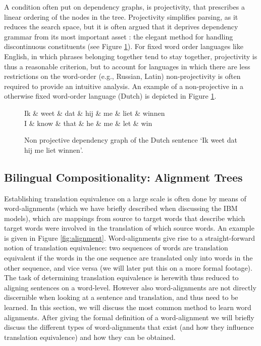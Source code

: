 \documentclass{report}
\theoremstyle{break}
\begin{document}
A condition often put on dependency graphs, is projectivity, that prescribes a linear ordering of the nodes in the tree. Projectivity simplifies parsing, as it reduces the search space, but it is often argued that it deprives dependency grammar from its most important asset \citep{covington1990dependency,debusmann2000introduction}: the elegant method for handling discontinuous constituents (see Figure \ref{fig:npdeptree}). For fixed word order languages like English, in which phrases belonging together tend to stay together, projectivity is thus a reasonable criterion, but to account for languages in which there are less restrictions on the word-order (e.g., Russian, Latin) non-projectivity is often required to provide an intuitive analysis. An example of a non-projective in a otherwise fixed word-order language (Dutch) is depicted in Figure \ref{fig:npdeptree}.

\begin{figure}[!ht]
\centering
\begin{dependency}[theme=simple]%
\begin{deptext}[column sep=.5cm, row sep=.1ex]
Ik \& weet \& dat \& hij \& me \& liet \& winnen\\
\tiny{I} \& \tiny{know} \& \tiny{that} \& \tiny{he} \& \tiny{me} \& \tiny{let} \& \tiny{win}\\
\end{deptext}
\end{dependency}
\caption{Non projective dependency graph of the Dutch sentence `Ik weet dat hij me liet winnen'.}\label{fig:npdeptree}
\end{figure}

\subsection{Bilingual Compositionality: Alignment Trees}

Establishing translation equivalence on a large scale is often done by means of word-alignments (which we have briefly described when discussing the IBM models), which are mappings from source to target words that describe which target words were involved in the translation of which source words. An example is given in Figure \ref{fig:alignment}. Word-alignments give rise to a straight-forward notion of translation equivalence: two sequences of words are translation equivalent if the words in the one sequence are translated only into words in the other sequence, and vice versa (we will later put this on a more formal footage). The task of determining translation equivalence is herewith thus reduced to aligning sentences on a word-level. However also word-alignments are not directly discernible when looking at a sentence and translation, and thus need to be learned. In this section, we will discuss the most common method to learn word alignments. After giving the formal definition of a word-alignment we will briefly discuss the different types of word-alignments that exist (and how they influence translation equivalence) and how they can be obtained.
\end{document}
